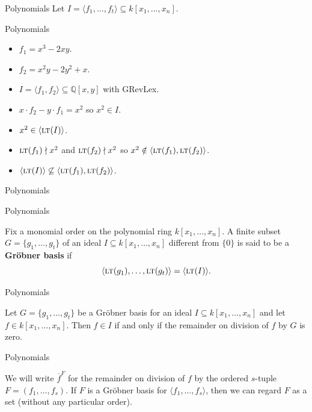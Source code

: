 \documentclass{beamer}
\def\bQ{\mathbb{Q}}
\def\sbs{\subseteq}
\newcommand{\LT}{\ensuremath{\text{\sc lt}}}
\begin{document}
\begin{frame}{Polynomials}
  Let $I = \langle f_1,\dots,f_t \rangle \sbs k[x_1,\dots,x_n]$.
  \uncover<2->{\[ \langle \LT(f_1),\dots,\LT(f_t) \rangle \sbs \langle \LT(I) \rangle. \]}
\end{frame}

\begin{frame}{Polynomials}
  \begin{itemize}
    \item $f_1=x^3-2xy$.
    \item<2-> $f_2=x^2y-2y^2+x$.
    \item<3-> $I = \langle f_1,f_2 \rangle \sbs \bQ[x,y]$ with GRevLex.
    \item<4-> $x \cdot f_2 - y \cdot f_1 = x^2$ so $x^2 \in I$.
    \item<5-> $x^2 \in \langle \LT(I) \rangle$.
    \item<6-> $\LT(f_1) \nmid x^2$ and $\LT(f_2) \nmid x^2$ so $x^2 \notin \langle \LT(f_1), \LT(f_2) \rangle$.
    \item <7-> $\langle \LT(I) \rangle \not\sbs \langle \LT(f_1), \LT(f_2) \rangle$.
  \end{itemize}
\end{frame}

\begin{frame}{Polynomials}
\end{frame}

\begin{frame}{Polynomials}
  \begin{definition}
    Fix a monomial order on the polynomial ring $k[x_1,\dots,x_n]$. A finite subset $G = \{ g_1,\dots,g_t \}$ of an ideal $I \sbs k[x_1,\dots,x_n]$ different from $\{0\}$ is said to be a \textbf{Gr\"obner basis} if
    \[ \langle \LT(g_1), \dots, \LT(g_t) \rangle = \langle \LT(I) \rangle. \]
  \end{definition}
\end{frame}

\begin{frame}{Polynomials}
  \begin{theorem}
    Let $G = \{ g_1,\dots,g_t \}$ be a Gr\"obner basis for an ideal $I \sbs k[x_1,\dots,x_n]$ and let $f \in k[x_1,\dots,x_n]$. Then $f \in I$ if and only if the remainder on division of $f$ by $G$ is zero.
  \end{theorem}
\end{frame}

\begin{frame}{Polynomials}
  \begin{definition}
    We will write $\overline f^{F}$ for the remainder on division of $f$ by the ordered $s$-tuple $F = (f_1,\dots,f_s)$. If $F$ is a Gr\"obner basis for $\langle f_1,\dots,f_s \rangle$, then we can regard $F$ as a set  (without any particular order).
  \end{definition}
\end{frame}
\end{document}
